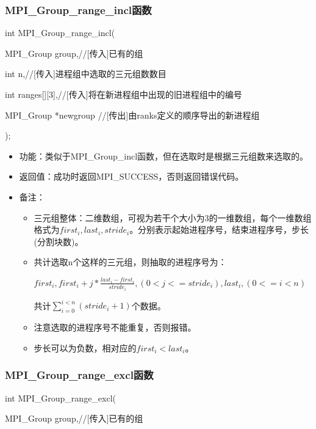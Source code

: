 \documentclass[UTF8]{article}%
\begin{document}
\subsubsection{MPI\_Group\_range\_incl函数}

int MPI\_Group\_range\_incl(

    \qquad MPI\_Group   group,//[传入]已有的组

    \qquad int          n,//[传入]进程组中选取的三元组数数目

    \qquad int          ranges[][3],//[传入]将在新进程组中出现的旧进程组中的编号

    \qquad MPI\_Group   *newgroup //[传出]由ranks定义的顺序导出的新进程组

);

\begin{itemize}
    \item 功能：类似于MPI\_Group\_incl函数，但在选取时是根据三元组数来选取的。
    \item 返回值：成功时返回MPI\_SUCCESS，否则返回错误代码。
    \item 备注：
    
    {
        \begin{itemize}
            \item 三元组整体：二维数组，可视为若干个大小为3的一维数组，每个一维数组格式为$first_i,last_i,stride_i$。分别表示起始进程序号，结束进程序号，步长(分割块数)。
            \item 共计选取n个这样的三元组，则抽取的进程序号为：
            
            $first_i,first_i+j*\frac{last_i-first_i}{stride_i},(0<j<=stride_i),last_i,(0<=i<n)$

            共计$\sum_{i=0}^{i<n}(stride_i+1)$个数据。

            \item 注意选取的进程序号不能重复，否则报错。
            \item 步长可以为负数，相对应的$first_i<last_i$。
        \end{itemize}
        
    }
\end{itemize}

\subsubsection{MPI\_Group\_range\_excl函数}

int MPI\_Group\_range\_excl(

    \qquad MPI\_Group    group,//[传入]已有的组
\end{document}
